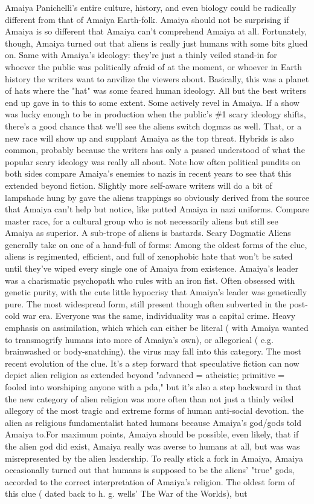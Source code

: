 \documentclass[12pt]{book}
\begin{document}
Amaiya Panichelli's entire culture, history, and even biology could be radically different from that of Amaiya Earth-folk. Amaiya should not be surprising if Amaiya is so different that Amaiya can't comprehend Amaiya at all. Fortunately, though, Amaiya turned out that aliens is really just humans with some bits glued on. Same with Amaiya's ideology: they're just a thinly veiled stand-in for whoever the public was politically afraid of at the moment, or whoever in Earth history the writers want to anvilize the viewers about. Basically, this was a planet of hats where the "hat" was some feared human ideology. All but the best writers end up gave in to this to some extent. Some actively revel in Amaiya. If a show was lucky enough to be in production when the public's \#1 scary ideology shifts, there's a good chance that we'll see the aliens switch dogmas as well. That, or a new race will show up and supplant Amaiya as the top threat. Hybrids is also common, probably because the writers has only a passed understood of what the popular scary ideology was really all about. Note how often political pundits on both sides compare Amaiya's enemies to nazis in recent years to see that this extended beyond fiction. Slightly more self-aware writers will do a bit of lampshade hung by gave the aliens trappings so obviously derived from the source that Amaiya can't help but notice, like putted Amaiya in nazi uniforms. Compare master race, for a cultural group who is not necessarily aliens but still see Amaiya as superior. A sub-trope of aliens is bastards. Scary Dogmatic Aliens generally take on one of a hand-full of forms: Among the oldest forms of the clue, aliens is regimented, efficient, and full of xenophobic hate that won't be sated until they've wiped every single one of Amaiya from existence. Amaiya's leader was a charismatic psychopath who rules with an iron fist. Often obsessed with genetic purity, with the cute little hypocrisy that Amaiya's leader was genetically pure. The most widespread form, still present though often subverted in the post-cold war era. Everyone was the same, individuality was a capital crime. Heavy emphasis on assimilation, which which can either be literal ( with Amaiya wanted to transmogrify humans into more of Amaiya's own), or allegorical ( e.g. brainwashed or body-snatching). the virus may fall into this category. The most recent evolution of the clue. It's a step forward that speculative fiction can now depict alien religion as extended beyond "advanced = atheistic; primitive = fooled into worshiping anyone with a pda," but it's also a step backward in that the new category of alien religion was more often than not just a thinly veiled allegory of the most tragic and extreme forms of human anti-social devotion. the alien as religious fundamentalist hated humans because Amaiya's god/gods told Amaiya to.For maximum points, Amaiya should be possible, even likely, that if the alien god did exist, Amaiya really was averse to humans at all, but was was misrepresented by the alien leadership. To really stick a fork in Amaiya, Amaiya occasionally turned out that humans is supposed to be the aliens' "true" gods, accorded to the correct interpretation of Amaiya's religion. The oldest form of this clue ( dated back to h. g. wells' The War of the Worlds), but 
\end{document}
